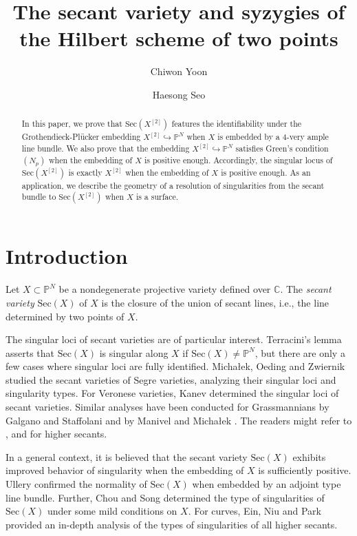 \documentclass[a4paper]{amsart}
\title{The secant variety and syzygies of the Hilbert scheme of two points}
\author{Chiwon Yoon}
\author{Haesong Seo}
\numberwithin{equation}{section}
\theoremstyle{plain}
\theoremstyle{definition}
\theoremstyle{remark}
\numberwithin{figure}{section}
\numberwithin{table}{section}
\numberwithin{equation}{section}
\def \CC {\mathbb{C}}
\def \PP {\mathbb{P}}
\newcommand{\Sec}{\mathrm{Sec}}
\begin{document}
\maketitle

\begin{abstract}
    In this paper, we prove that $\mathrm{Sec} (X^{[2]})$ features the identifiability under the Grothendieck-Pl\"ucker embedding $X^{[2]} \hookrightarrow \PP^N$ when $X$ is embedded by a $4$-very ample line bundle.
    We also prove that the embedding $X^{[2]} \hookrightarrow \PP^N$ satisfies Green's condition $(N_p)$ when the embedding of $X$ is positive enough.
    Accordingly, the singular locus of $\mathrm{Sec} (X^{[2]})$ is exactly $X^{[2]}$ when the embedding of $X$ is positive enough.
    As an application, we describe the geometry of a resolution of singularities from the secant bundle to $\mathrm{Sec}(X^{[2]})$ when $X$ is a surface.
\end{abstract}



\section{Introduction} \label{sec:intro}

Let $X \subset \PP^N$ be a nondegenerate projective variety defined over $\CC$.
The \textit{secant variety} $\Sec(X)$ of $X$ is the closure of the union of secant lines, i.e., the line determined by two points of $X$.

The singular loci of secant varieties are of particular interest.
Terracini's lemma asserts that $\Sec(X)$ is singular along $X$ if $\Sec(X)\neq \PP^N$, but there are only a few cases where singular loci are fully identified.
Micha\l ek, Oeding and Zwiernik \cite{MOZ2015} studied the secant varieties of Segre varieties, analyzing their singular loci and singularity types.
For Veronese varieties, Kanev \cite{Kanev1999} determined the singular loci of secant varieties.
Similar analyses have been conducted for Grassmannians by Galgano and Staffolani \cite{GS2022} and by Manivel and Micha\l ek \cite{MM2015}.
The readers might refer to \cite{AB2013}, \cite{FH2021} and \cite{Han2018} for higher secants.

In a general context, it is believed that the secant variety $\mathrm{Sec}(X)$ exhibits improved behavior of singularity when the embedding of $X$ is sufficiently positive.
Ullery \cite{Ullery2016} confirmed the normality of $\mathrm{Sec}(X)$ when embedded by an adjoint type line bundle.
Further, Chou and Song \cite{CS2018} determined the type of singularities of $\mathrm{Sec}(X)$ under some mild conditions on $X$.
For curves, Ein, Niu and Park \cite{ENP2020} provided an in-depth analysis of the types of singularities of all higher secants.
\end{document}
